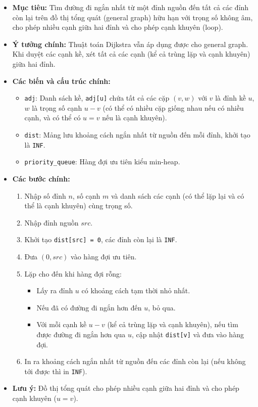 \documentclass{article}
\begin{document}
\begin{itemize}
    \item \textbf{Mục tiêu:} Tìm đường đi ngắn nhất từ một đỉnh nguồn đến tất cả các đỉnh còn lại trên đồ thị tổng quát (general graph) hữu hạn với trọng số không âm, cho phép nhiều cạnh giữa hai đỉnh và cho phép cạnh khuyên (loop).
    \item \textbf{Ý tưởng chính:} Thuật toán Dijkstra vẫn áp dụng được cho general graph. Khi duyệt các cạnh kề, xét tất cả các cạnh (kể cả trùng lặp và cạnh khuyên) giữa hai đỉnh.
    \item \textbf{Các biến và cấu trúc chính:}
    \begin{itemize}
        \item \texttt{adj}: Danh sách kề, \texttt{adj[u]} chứa tất cả các cặp $(v, w)$ với $v$ là đỉnh kề $u$, $w$ là trọng số cạnh $u-v$ (có thể có nhiều cặp giống nhau nếu có nhiều cạnh, và có thể có $u = v$ nếu là cạnh khuyên).
        \item \texttt{dist}: Mảng lưu khoảng cách ngắn nhất từ nguồn đến mỗi đỉnh, khởi tạo là \texttt{INF}.
        \item \texttt{priority\_queue}: Hàng đợi ưu tiên kiểu min-heap.
    \end{itemize}
    \item \textbf{Các bước chính:}
    \begin{enumerate}
        \item Nhập số đỉnh $n$, số cạnh $m$ và danh sách các cạnh (có thể lặp lại và có thể là cạnh khuyên) cùng trọng số.
        \item Nhập đỉnh nguồn $src$.
        \item Khởi tạo \texttt{dist[src] = 0}, các đỉnh còn lại là \texttt{INF}.
        \item Đưa $(0, src)$ vào hàng đợi ưu tiên.
        \item Lặp cho đến khi hàng đợi rỗng:
        \begin{itemize}
            \item Lấy ra đỉnh $u$ có khoảng cách tạm thời nhỏ nhất.
            \item Nếu đã có đường đi ngắn hơn đến $u$, bỏ qua.
            \item Với mỗi cạnh kề $u-v$ (kể cả trùng lặp và cạnh khuyên), nếu tìm được đường đi ngắn hơn qua $u$, cập nhật \texttt{dist[v]} và đưa vào hàng đợi.
        \end{itemize}
        \item In ra khoảng cách ngắn nhất từ nguồn đến các đỉnh còn lại (nếu không tới được thì in \texttt{INF}).
    \end{enumerate}
    \item \textbf{Lưu ý:} Đồ thị tổng quát cho phép nhiều cạnh giữa hai đỉnh và cho phép cạnh khuyên ($u = v$).
\end{itemize}

\end{document}
